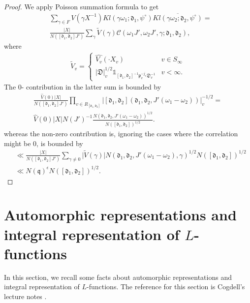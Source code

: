 \documentclass[a4paper,11pt]{amsart}
\theoremstyle{definition}
\begin{document}
    \begin{proof}  We apply Poisson summation formula to get 
    \begin{align*}&\sum_{\gamma \in F}V(\gamma X^{-1})Kl(\gamma\omega_1;\mathfrak{d}_1,\psi^{\circ})\overline{Kl(\gamma\omega_2;\mathfrak{d}_2,\psi^{\circ})} =
    \\& \frac{\vert{X}\vert }{N([\mathfrak{d}_1,\mathfrak{d}_2]J')} \sum_{\gamma} \widetilde{V}(\gamma)\mathcal{C}(\omega_1 J',\omega_2 J',\gamma;\mathfrak{d}_1,\mathfrak{d}_2),    
    \end{align*}
    where \begin{align*}
        \widetilde{V}_v = \begin{cases}
            \widehat{V_v}(\cdot X_v) & v \in S_{\infty}\\ \vert{\mathfrak{D}}\vert_v^{1/2}\mathbb{1}_{[\mathfrak{d}_1,\mathfrak{d}_2]^{-1}\mathfrak{p}_v^{-j_v}\mathfrak{D}_v^{-1}}&v<\infty.
        \end{cases}
    \end{align*}
    The $0$- contribution in the latter sum is bounded by
    \begin{align*}\frac{\widehat{V}(0)\vert{X}\vert }{N([\mathfrak{d}_1,\mathfrak{d}_2]J')}\prod_{v\in R_{[\mathfrak{d}_1,\mathfrak{d}_2]}}\vert{[\mathfrak{d}_1,\mathfrak{d}_2] (\mathfrak{d}_1,\mathfrak{d}_2,J'(\omega_1-\omega_2))}\vert_v^{-1/2} =\\  \widehat{V}(0)\vert{X}\vert N(J')^{-1}\frac{N(\mathfrak{d}_1,\mathfrak{d}_2,J'(\omega_1-\omega_2))^{1/2}}{N([\mathfrak{d}_1,\mathfrak{d}_2])^{1/2}}. \end{align*}
    whereas the non-zero contribution is, ignoring the cases where the correlation might be $0$, is bounded by 
    \begin{align*}&\ll \frac{\vert{X}\vert  }{N([\mathfrak{d}_1,\mathfrak{d}_2]J')}\sum_{\gamma \neq 0}\vert{\tilde{V}(\gamma)}\vert N(\mathfrak{d}_1,\mathfrak{d}_2,J'(\omega_1-\omega_2),\gamma)^{1/2}N([\mathfrak{d}_1,\mathfrak{d}_2])^{1/2} \\ &\ll N(\mathfrak{q})^{\epsilon}N([\mathfrak{d}_1,\mathfrak{d}_2])^{1/2}.  \end{align*}
    \end{proof}
    


\section{Automorphic representations and integral representation of $L$-functions}\label{sec:integralrep}
In this section, we recall some facts about automorphic representations and integral representation of $L$-functions. The reference for this section is Cogdell's lecture notes \cite{cogdell-lfunctions}. 
\end{document}
